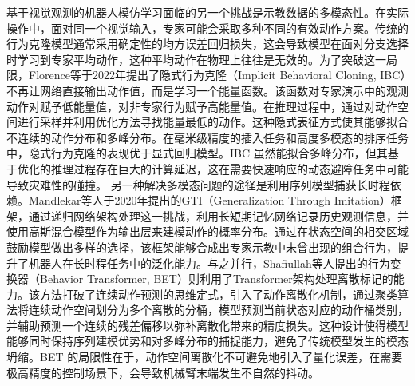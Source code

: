 基于视觉观测的机器人模仿学习面临的另一个挑战是示教数据的多模态性。在实际操作中，面对同一个视觉输入，专家可能会采取多种不同的有效动作方案。传统的行为克隆模型通常采用确定性的均方误差回归损失，这会导致模型在面对分支选择时学习到专家平均动作，这种平均动作在物理上往往是无效的。为了突破这一局限，Florence等于2022年提出了隐式行为克隆（Implicit Behavioral Cloning, IBC）\cite{florence2022implicit}不再让网络直接输出动作值，而是学习一个能量函数。该函数对专家演示中的观测动作对赋予低能量值，对非专家行为赋予高能量值。在推理过程中，通过对动作空间进行采样并利用优化方法寻找能量最低的动作。这种隐式表征方式使其能够拟合不连续的动作分布和多峰分布。在毫米级精度的插入任务和高度多模态的排序任务中，隐式行为克隆的表现优于显式回归模型。IBC 虽然能拟合多峰分布，但其基于优化的推理过程存在巨大的计算延迟，这在需要快速响应的动态避障任务中可能导致灾难性的碰撞。
另一种解决多模态问题的途径是利用序列模型捕获长时程依赖。Mandlekar等人于2020年提出的GTI（Generalization Through Imitation）框架\cite{mandlekar2020learning}，通过递归网络架构处理这一挑战，利用长短期记忆网络记录历史观测信息，并使用高斯混合模型作为输出层来建模动作的概率分布。通过在状态空间的相交区域鼓励模型做出多样的选择，该框架能够合成出专家示教中未曾出现的组合行为，提升了机器人在长时程任务中的泛化能力。与之并行，Shafiullah等人提出的行为变换器（Behavior Transformer, BET）\cite{shafiullah2022behavior}则利用了Transformer架构\cite{vaswani2017attention}处理离散标记的能力。该方法打破了连续动作预测的思维定式，引入了动作离散化机制，通过聚类算法将连续动作空间划分为多个离散的分桶，模型预测当前状态对应的动作桶类别，并辅助预测一个连续的残差偏移以弥补离散化带来的精度损失。这种设计使得模型能够同时保持序列建模优势和对多峰分布的捕捉能力，避免了传统模型发生的模态坍缩。BET 的局限性在于，动作空间离散化不可避免地引入了量化误差，在需要极高精度的控制场景下，会导致机械臂末端发生不自然的抖动。

